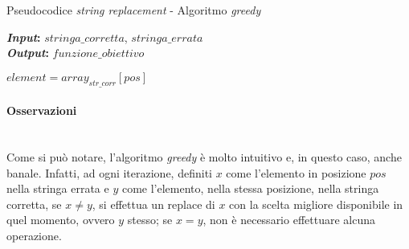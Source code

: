 \begin{algorithm}[!h]
    \captionsetup{labelformat=empty}
    \caption{Pseudocodice \textit{string replacement} - Algoritmo \textit{greedy}}
    \vspace{0.1cm}
    \hspace*{\algorithmicindent} \textbf{\textit{Input}:} {$stringa\_corretta$}, {$stringa\_errata$}\\
    \hspace*{\algorithmicindent} \textbf{\textit{Output}:} {$funzione\_obiettivo$}
    \begin{algorithmic}[1]
                \State $element = array_{str\_corr}[pos]$
            \EndIf
        \EndFor
        \State {}
        \EndProcedure
    \end{algorithmic}
\end{algorithm}

\noindent \paragraph{Osservazioni}\hfill\\
Come si può notare, l'algoritmo \textit{greedy} è molto intuitivo e, in questo caso,
anche banale.
Infatti, ad ogni iterazione, definiti $x$ come l'elemento in posizione $pos$ nella
stringa errata e $y$ come l'elemento, nella stessa posizione, nella stringa corretta,
se $x \neq y$, si effettua un replace di $x$ con la scelta migliore disponibile
in quel momento, ovvero $y$ stesso; se $x = y$, non è necessario effettuare alcuna operazione.


